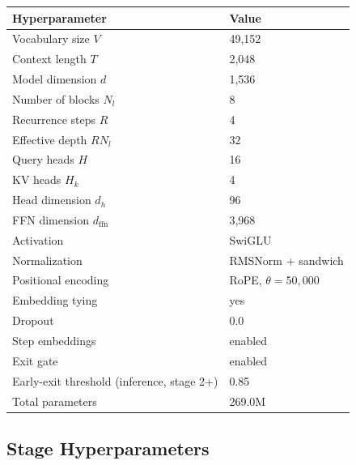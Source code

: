 \documentclass[11pt,a4paper]{article}
\begin{document}
\begin{table}[h]
  \centering
  \footnotesize
  \begin{tabular}{ll}
    \toprule
    Hyperparameter & Value \\
    \midrule
    Vocabulary size $V$ & 49{,}152 \\
    Context length $T$ & 2{,}048 \\
    Model dimension $d$ & 1{,}536 \\
    Number of blocks $N_l$ & 8 \\
    Recurrence steps $R$ & 4 \\
    Effective depth $R N_l$ & 32 \\
    Query heads $H$ & 16 \\
    KV heads $H_k$ & 4 \\
    Head dimension $d_h$ & 96 \\
    FFN dimension $d_{\mathrm{ffn}}$ & 3{,}968 \\
    Activation & SwiGLU \\
    Normalization & RMSNorm + sandwich \\
    Positional encoding & RoPE, $\theta = 50{,}000$ \\
    Embedding tying & yes \\
    Dropout & 0.0 \\
    Step embeddings & enabled \\
    Exit gate & enabled \\
    Early-exit threshold (inference, stage 2+) & 0.85 \\
    Total parameters & 269.0M \\
    \bottomrule
  \end{tabular}
\end{table}

\subsection{Stage Hyperparameters}
\end{document}
